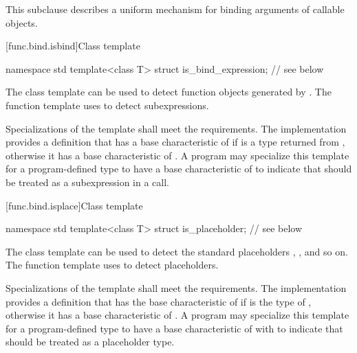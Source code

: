 \pnum
This subclause describes a uniform mechanism for binding
arguments of callable objects.

[func.bind.isbind]{Class template }

%
\begin{codeblock}
namespace std {
  template<class T> struct is_bind_expression;  // see below
}
\end{codeblock}

\pnum
The class template  can be used to detect function objects
generated by . The function template 
uses  to detect subexpressions.

\pnum
Specializations of the  template shall meet
the  requirements. The implementation
provides a definition that has a base characteristic of
 if  is a type returned from ,
otherwise it has a base characteristic of .
A program may specialize this template for a program-defined type 
to have a base characteristic of  to indicate that
 should be treated as a subexpression in a  call.

[func.bind.isplace]{Class template }

%
\begin{codeblock}
namespace std {
  template<class T> struct is_placeholder;      // see below
}
\end{codeblock}

\pnum
The class template  can be used to detect the standard placeholders
, , and so on. The function template  uses
 to detect placeholders.

\pnum
Specializations of the  template shall meet
the  requirements. The implementation
provides a definition that has the base characteristic of
 if  is the type of
, otherwise it has a
base characteristic of . A program
may specialize this template for a program-defined type  to
have a base characteristic of 
with  to indicate that  should be
treated as a placeholder type.

